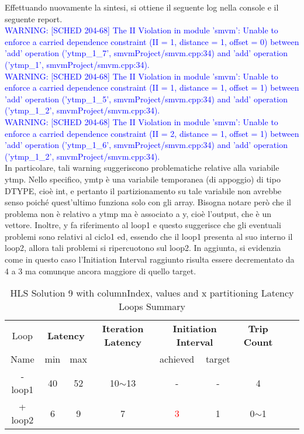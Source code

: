

Effettuando nuovamente la sintesi, si ottiene il seguente log nella console e il seguente report.
\\
\textcolor{blue}{WARNING: [SCHED 204-68] The II Violation in module 'smvm': Unable to enforce a carried dependence constraint (II = 1, distance = 1, offset = 0)
	between 'add' operation ('ytmp\_1\_7', smvmProject/smvm.cpp:34) and 'add' operation ('ytmp\_1', smvmProject/smvm.cpp:34).}
\\
\textcolor{blue}{WARNING: [SCHED 204-68] The II Violation in module 'smvm': Unable to enforce a carried dependence constraint (II = 1, distance = 1, offset = 1)
	between 'add' operation ('ytmp\_1\_5', smvmProject/smvm.cpp:34) and 'add' operation ('ytmp\_1\_2', smvmProject/smvm.cpp:34).}
\\
\textcolor{blue}{WARNING: [SCHED 204-68] The II Violation in module 'smvm': Unable to enforce a carried dependence constraint (II = 2, distance = 1, offset = 1)
	between 'add' operation ('ytmp\_1\_6', smvmProject/smvm.cpp:34) and 'add' operation ('ytmp\_1\_2', smvmProject/smvm.cpp:34).}
\\

In particolare, tali warning suggeriscono problematiche relative alla variabile ytmp. Nello specifico, ymtp è una variabile temporanea (di appoggio) di tipo DTYPE, cioè int, e pertanto il partizionamento su tale variabile non avrebbe senso poiché quest'ultimo funziona solo con gli array. Bisogna notare però che il problema non è relativo a ytmp ma è associato a y, cioè l'output, che è un vettore. Inoltre, y fa riferimento al loop1 e questo suggerisce che gli eventuali problemi sono relativi al ciclo1 ed, essendo che il loop1 presenta al suo interno il loop2, allora tali problemi si ripercuotono sul loop2. In aggiunta, si evidenzia come in questo caso l'Initiation Interval raggiunto risulta essere decrementato da 4 a 3 ma comunque ancora maggiore di quello target. 

\begin{table}[H]
	\centering
	\begin{tabular}{|c|c|c|c|c|c|c|c|c|}
		\hline
		\multicolumn{1}{|c|}{Loop} & \multicolumn{2}{|c|}{\textbf{Latency}} & \multicolumn{1}{c|}{\textbf{Iteration Latency}} & \multicolumn{2}{c|}{\textbf{Initiation Interval}} & \multicolumn{1}{c|}{\textbf{Trip Count}}  \\
		Name & min & max &  & achieved & target &  \\
		\hline
		- loop1 & 40 & 52 & 10$\sim$13 & - & - & 4 \\
		+ loop2 & 6 & 9 & 7 & \textcolor{red}{3} & 1 & 0$\sim$1 \\
		\hline
	\end{tabular}
	\caption{HLS Solution 9 with columnIndex, values and x partitioning Latency Loops Summary}
	\label{tab:hls-solution-9-columnindex-values-partitioning-loop-summary}
\end{table}

